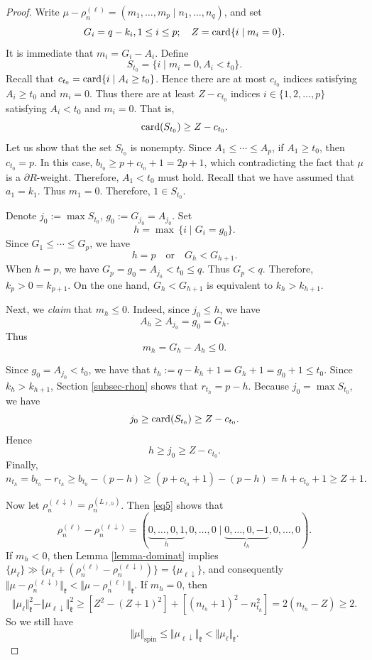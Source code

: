 \documentclass[11pt]{amsart}
\theoremstyle{plain}
\theoremstyle{definition}
\def\card{\mathop{\hbox {card}}\nolimits}
\newcommand{\frk}{\mathfrak{k}}
\begin{document}
\begin{proof}
	Write $\mu-\rho_n^{(\ell)}=(m_1,\dots,m_p\mid n_1,\dots,n_q)$, and set
	\[G_i=q-k_i, 1\leq i\leq p; \quad Z=\card\{i\mid m_i=0\}.\]
	It is immediate that $m_i=G_i-A_i$. Define
	\[S_{t_0}=\{i\mid m_i=0,A_i<t_0\}.\]
	Recall that $c_{t_0}=\card\{i\mid A_i\ge t_0\}$. Hence there are at most $c_{t_0}$ indices satisfying $A_i\ge t_0$ and $m_i=0$. Thus there are at least $Z-c_{t_0}$ indices $i\in\{1, 2, \dots, p\}$ satisfying $A_i<t_0$ and $m_i=0$. That is,
	\[\card(S_{t_0})\ge Z-c_{t_0}.\]
	Let us show that the set $S_{t_0}$ is nonempty. Since $A_1\le \cdots\le A_p$, if $A_1\ge t_0$, then $c_{t_0}=p$. In this case, $b_{t_0}\ge p+c_{t_0}+1=2p+1$, which contradicting the fact that $\mu$ is a $\partial R$-weight. Therefore, $A_1<t_0$ must hold. Recall that we have assumed that $a_1=k_1$. Thus $m_1=0$. Therefore, $1\in S_{t_0}$.
	
	Denote $j_0:=\max S_{t_0}$,  $g_0:=G_{j_0}=A_{j_0}$. Set
	\[h=\max\,\{i\mid G_i=g_0\}.\]
	Since $G_1\le \cdots\le G_p$, we have
	\[h=p\quad\mbox{or}\quad G_h<G_{h+1}.\]
	 When $h=p$, we have $G_p=g_0=A_{j_0}<t_0\le q$. Thus $G_p<q$. Therefore, $k_p>0=k_{p+1}$. On the one hand, $G_h<G_{h+1}$ is equivalent to $k_h>k_{h+1}$.
	
	Next, we \emph{claim} that $m_h\le 0$. Indeed, since $j_0 \le h$, we have
	\[A_h\ge A_{j_0}=g_0=G_h.\]
Thus
	\[m_h=G_h-A_h\le 0.\]
	
	Since $g_0=A_{j_0}<t_0$, we have that $t_h:=q-k_h+1=G_h+1=g_0+1\le t_0$. Since $k_h > k_{h+1}$, Section \ref{subsec-rhon} shows that $r_{t_h}=p-h$. Because $j_0=\max S_{t_0}$, we have
$$
j_0\ge\card(S_{t_0})\ge Z-c_{t_0}.$$
Hence
	\[h\ge j_0\ge Z-c_{t_0}.\]
	Finally,
	\[n_{t_h}=b_{t_h}-r_{t_h}\ge b_{t_0}-(p-h)\ge (p+c_{t_0}+1)-(p-h)=h+c_{t_0}+1 \ge Z+1.\]
	
	Now let $\rho_n^{(\ell\downarrow)}=\rho_n^{(L_{\ell,h})}$. Then \eqref{eq5} shows that
	\[\rho_n^{(\ell)}-\rho_n^{(\ell\downarrow)}=(\underbrace{0,\dots,0,1}_{h},0,\dots,0 \mid \underbrace{0,\dots,0,-1}_{t_h},0,\dots,0).\]
	If $m_h<0$, then Lemma \ref{lemma-dominat} implies $\{\mu_\ell\}\gg\{\mu_\ell+(\rho_n^{(\ell)}-\rho_n^{(\ell\downarrow)})\}=\{\mu_{\ell\downarrow}\}$, and consequently $\Vert\mu-\rho_n^{(\ell\downarrow)}\Vert_\frk<\Vert\mu-\rho_n^{(\ell)}\Vert_\frk$. If $m_h=0$, then
	\[\Vert\mu_{\ell}\Vert^2_\frk-\Vert\mu_{\ell\downarrow}\Vert^2_\frk\ge[Z^2-(Z+1)^2]+[(n_{t_h}+1)^2-n_{t_h}^2]=2(n_{t_h}-Z)\ge 2.\]
So we  still have
	\[\Vert\mu\Vert_{\mathrm{spin}}\le\Vert\mu_{\ell\downarrow}\Vert_\frk <\Vert\mu_\ell\Vert_\frk.\]
\end{proof}
\end{document}
